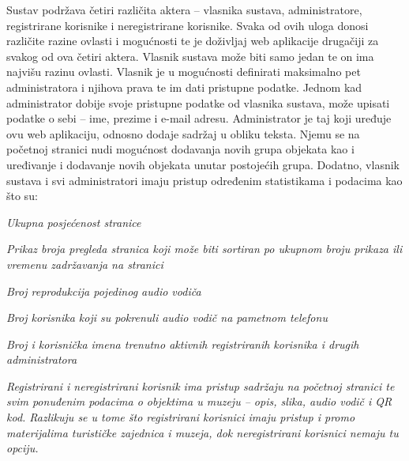 {			Sustav podržava četiri različita aktera – vlasnika sustava, administratore, registrirane korisnike i neregistrirane korisnike. Svaka od ovih uloga donosi različite razine ovlasti i mogućnosti te je doživljaj web aplikacije drugačiji za svakog od ova četiri aktera. 
			Vlasnik sustava može biti samo jedan te on ima najvišu razinu ovlasti. Vlasnik je u mogućnosti definirati maksimalno pet administratora i njihova prava te im dati pristupne podatke. 
			Jednom kad administrator dobije svoje pristupne podatke od vlasnika sustava, može upisati podatke o sebi – ime, prezime i e-mail adresu. Administrator je taj koji uređuje ovu web aplikaciju, odnosno dodaje sadržaj u obliku teksta. Njemu se na početnoj stranici nudi mogućnost dodavanja novih grupa objekata kao i uređivanje i dodavanje novih objekata unutar postojećih grupa. 
			Dodatno, vlasnik sustava i svi administratori imaju pristup određenim statistikama i podacima kao što su: }
		
		\begin{packed_item}
			\item \textit{Ukupna posjećenost stranice}
			\item \textit{Prikaz broja pregleda stranica koji može biti sortiran po ukupnom broju prikaza ili vremenu zadržavanja na stranici}
			\item \textit{Broj reprodukcija pojedinog audio vodiča}
			\item \textit{Broj korisnika koji su pokrenuli audio vodič na pametnom telefonu }
			\item \textit{	Broj i korisnička imena trenutno aktivnih registriranih korisnika i drugih administratora}
	
		\end{packed_item}
		
		\textit{	Registrirani i neregistrirani korisnik ima pristup sadržaju na početnoj stranici te svim ponuđenim podacima o objektima u muzeju – opis, slika, audio vodič i QR kod. Razlikuju se u tome što registrirani korisnici imaju pristup i promo materijalima turističke zajednica i muzeja, dok neregistrirani korisnici nemaju tu opciju. }
		\eject
			


		
		
		
	